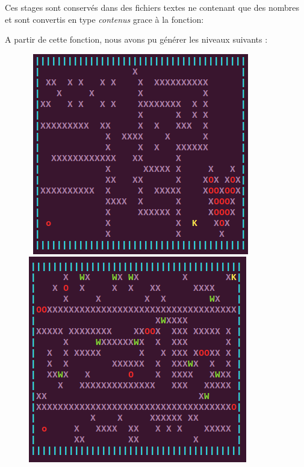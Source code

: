 \documentclass[11pt,a4paper]{article}
\begin{document}
       
       Ces stages sont conservés dans des fichiers textes ne contenant que des nombres et sont convertis en type \textit{contenus} grace à la fonction: 
        
        \begin{algorithm}
        \end{algorithm}

        A partir de cette fonction, nous avons pu générer les niveaux suivants : 
        
        \begin {figure}[htbp]
        \hbox{ 
        \includegraphics[scale=0.6]{./images/stage1.png}
        \hspace*{1cm}  %
        \includegraphics[scale=0.6]{./images/stageAlexD.png}
  }
        \end {figure}
        
\end{document}
